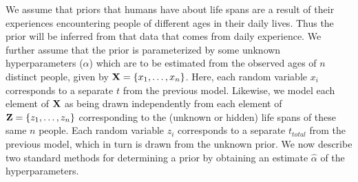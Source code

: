 \documentclass[10pt,letterpaper]{article}
\renewcommand{\vec}[1]{{\bf {#1}}}
\begin{document}
We assume that priors that humans have about life spans are a result of their experiences encountering people of different ages in their daily lives. Thus the prior will be inferred from that data that comes from daily experience. We further assume that the prior is parameterized by some unknown hyperparameters ($\alpha$) which are to be estimated from the observed ages of $n$ distinct people, given by $\vec{X} = \{x_1, \ldots, x_n\}$. Here, each random variable $x_i$ corresponds to a separate $t$ from the previous model. Likewise, we model each element of $\vec{X}$ as being drawn independently from each element of $\vec{Z} = \{z_1, \ldots, z_n\}$ corresponding to the (unknown or hidden) life spans of these same $n$ people. Each random variable $z_i$ corresponds to a separate $t_{total}$ from the previous model, which in turn is drawn from the unknown prior. We now describe two standard methods for determining a prior by obtaining an estimate $\hat{\alpha}$ of the hyperparameters.
\end{document}

